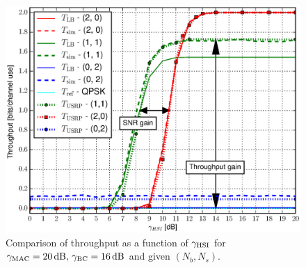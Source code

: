 \documentclass{article}
\begin{document}
\begin{figure}
\begin{centering}
\hspace*{-0.04\columnwidth}
\includegraphics[clip,width=0.95\columnwidth]{fig/Throughput_HSI_XOR_MAC20_BC16_N2}
\par\end{centering}

\caption{Comparison of throughput as a function of $\gamma_{{\rm {HSI}}}$
for $\gamma_{{\rm {MAC}}}=20\,\mathrm{dB},\,\gamma_{{\rm {BC}}}=16\,\mathrm{dB}$
and given $(N_{b},N_{s})$. \label{fig:CTUpp_Throughput20_16}}
\end{figure}
\end{document}
